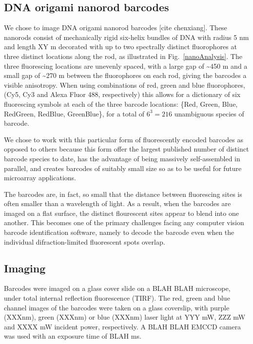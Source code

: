 \subsection{DNA origami nanorod barcodes}
We chose to image DNA origami nanorod barcodes [cite chenxiang]. These nanorods consist of mechanically rigid six-helix bundles of DNA with radius 5 nm and length XY \textmu m decorated with  up to two spectrally distinct fluorophores at three distinct locations along the rod, as illustrated in Fig.~\ref{nanoAnalysis}. The three fluorescing locations are unevenly spaced, with a large gap of \textasciitilde 450 \textmu m and a small gap of \textasciitilde 270 \textmu m  between the fluorophores on each rod, giving the barcodes a visible anisotropy. When using combinations of red, green and blue fluorophores, (Cy5, Cy3 and Alexa Fluor 488, respectively) this allows for a dictionary of six fluorescing symbols at each of the three barcode locations: \{Red, Green, Blue, RedGreen, RedBlue, GreenBlue\}, for a total of $6^{3}=216$  unambiguous species of barcode.

We chose to work with this particular form of fluorescently encoded barcodes as opposed to others because this form offer the largest published number of distinct barcode species to date, has the advantage of being massively self-assembled in parallel, and creates barcodes of suitably small  size so as to be useful for future microarray applications. 

The barcodes are, in fact, so small that the distance between fluorescing sites is often smaller than a wavelength of light. As a result, when the barcodes are imaged on a flat surface, the distinct flourescent sites appear to blend into one another. This becomes one of the primary challenges facing any computer vision barcode identification software, namely to  decode the barcode even when the individual difraction-limited fluorescent spots overlap. 

\subsection{Imaging}
Barcodes were imaged on a glass cover slide on a BLAH BLAH microscope,  under total internal reflection fluorescence (TIRF). 
The red, green and blue channel images of the barcodes were taken on a glass coverslip, with purple (XXXnm), green (XXXnm) or blue (XXXnm) laser light at YYY mW, ZZZ mW and XXXX mW incident power, respectively. A BLAH BLAH EMCCD camera was used with an exposure time of BLAH ms.
 
